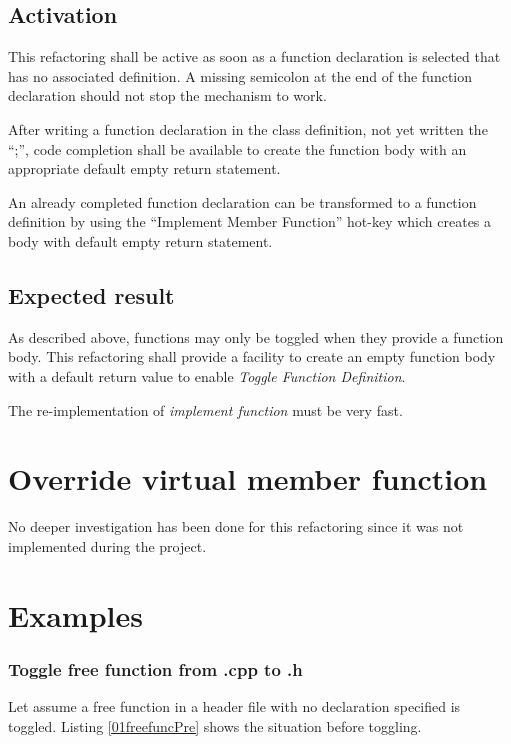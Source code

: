 
\subsection{Activation}
This refactoring shall be active as soon as a function declaration is selected 
that has no associated definition. A missing semicolon at the end of the 
function declaration should not stop the mechanism to work.

After writing a function declaration in the class definition, not yet written
the ``;'', code completion shall be available to create the function body with an
appropriate default empty return statement.\newline

An already completed function declaration can be transformed to a function
definition by using the ``Implement Member Function'' hot-key which creates a
body with default empty return statement.

\subsection{Expected result}
As described above, functions may only be toggled when they provide a function 
body. This refactoring shall provide a facility to create an empty function body 
with a default return value to enable \textit{Toggle Function Definition}.

The re-implementation of \textit{implement function} must be very fast. 

\section{Override virtual member function}

No deeper investigation has been done for this refactoring since it was not 
implemented during the project.

\section{Examples}


\subsubsection{Toggle free function from .cpp to .h}
Let assume a free function in a header file with no declaration specified is
toggled. Listing \nolinebreak\ref{01freefuncPre} shows the situation before
toggling. 

